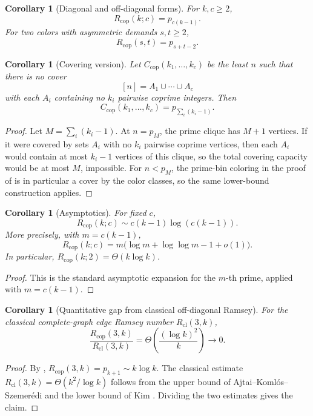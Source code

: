 \documentclass[11pt]{article}
\theoremstyle{plain}
\newtheorem{corollary}[theorem]{Corollary}
\theoremstyle{definition}
\theoremstyle{remark}
\newcommand{\Rcop}{R_{\mathrm{cop}}}
\newcommand{\Rcl}{R_{\mathrm{cl}}}
\begin{document}
\begin{corollary}[Diagonal and off-diagonal forms]
\label{cor:forms}
For $k,c\ge 2$,
\[
  \Rcop(k;c)=p_{c(k-1)}.
\]
For two colors with asymmetric demands $s,t\ge 2$,
\[
  \Rcop(s,t)=p_{s+t-2}.
\]
\end{corollary}

\begin{corollary}[Covering version]
\label{cor:covering}
Let $C_{\mathrm{cop}}(k_1,\ldots,k_c)$ be the least $n$ such that there is no
cover
\[
  [n]=A_1\cup\cdots\cup A_c
\]
with each $A_i$ containing no $k_i$ pairwise coprime integers.  Then
\[
  C_{\mathrm{cop}}(k_1,\ldots,k_c)=p_{\sum_i(k_i-1)}.
\]
\end{corollary}

\begin{proof}
Let $M=\sum_i(k_i-1)$.  At $n=p_M$, the prime clique has $M+1$ vertices.  If
it were covered by sets $A_i$ with no $k_i$ pairwise coprime vertices, then
each $A_i$ would contain at most $k_i-1$ vertices of this clique, so the total
covering capacity would be at most $M$, impossible.  For $n<p_M$, the
prime-bin coloring in the proof of  is in particular a cover by
the color classes, so the same lower-bound construction applies.
\end{proof}

\begin{corollary}[Asymptotics]
For fixed $c$,
\[
  \Rcop(k;c)\sim c(k-1)\log(c(k-1)).
\]
More precisely, with $m=c(k-1)$,
\[
  \Rcop(k;c)
  =m\bigl(\log m+\log\log m-1+o(1)\bigr).
\]
In particular, $\Rcop(k;2)=\Theta(k\log k)$.
\end{corollary}

\begin{proof}
This is the standard asymptotic expansion for the $m$-th prime, applied with
$m=c(k-1)$.
\end{proof}

\begin{corollary}[Quantitative gap from classical off-diagonal Ramsey]
\label{cor:r3k-gap}
For the classical complete-graph edge Ramsey number $\Rcl(3,k)$,
\[
  \frac{\Rcop(3,k)}{\Rcl(3,k)}
  =\Theta\!\left(\frac{(\log k)^2}{k}\right)\to0 .
\]
\end{corollary}

\begin{proof}
By , $\Rcop(3,k)=p_{k+1}\sim k\log k$.  The classical estimate
$\Rcl(3,k)=\Theta(k^2/\log k)$ follows from the upper bound of
Ajtai--Koml\'os--Szemer\'edi and the lower bound of Kim
\cite{ajtai-komlos-szemeredi1980,kim1995}.  Dividing the two estimates gives
the claim.
\end{proof}
\end{document}
